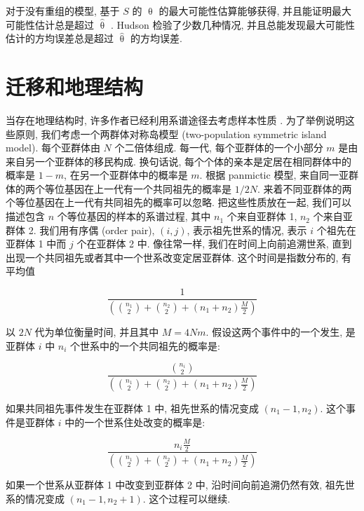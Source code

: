 \documentclass[12pt]{article}
\begin{document}
对于没有重组的模型, 基于 $S$ 的 $\uptheta$ 的最大可能性估算能够获得,
并且能证明最大可能性估计总是超过 $\hat{\uptheta}$ \parencite{tavare1984}.
Hudson 检验了少数几种情况, 并且总能发现最大可能性估计的方均误差总是超过 $\hat{\uptheta}$ 的方均误差.

\section{迁移和地理结构}

当存在地理结构时, 许多作者已经利用系谱途径去考虑样本性质 \parencite{griffiths1981a, tajima1989}.
为了举例说明这些原则, 我们考虑一个两群体对称岛模型 (two-population symmetric island model).
每个亚群体由 $N$ 个二倍体组成. 每一代, 每个亚群体的一个小部分 $m$ 是由来自另一个亚群体的移民构成.
换句话说, 每个个体的亲本是定居在相同群体中的概率是 $1-m$, 在另一个亚群体中的概率是 $m$.
根据 panmictic 模型, 来自同一亚群体的两个等位基因在上一代有一个共同祖先的概率是 $1/2N$.
来着不同亚群体的两个等位基因在上一代有共同祖先的概率可以忽略. 把这些性质放在一起, 我们可以描述包含 $n$
个等位基因的样本的系谱过程, 其中 $n_{1}$ 个来自亚群体 1, $n_{2}$ 个来自亚群体 2. 我们用有序偶 (order pair),
$(i,j)$, 表示祖先世系的情况, 表示 $i$ 个祖先在亚群体 1 中而 $j$ 个在亚群体 2 中.
像往常一样, 我们在时间上向前追溯世系, 直到出现一个共同祖先或者其中一个世系改变定居亚群体.
这个时间是指数分布的, 有平均值

\begin{equation*}
    \frac{1}{(\binom{n_1}{2}+\binom{n_2}{2}+(n_{1}+n_{2})\frac{M}{2})}
\end{equation*}

以 $2N$ 代为单位衡量时间, 并且其中 $M=4Nm$. 假设这两个事件中的一个发生, 是亚群体 $i$ 中 $n_{i}$
个世系中的一个共同祖先的概率是:

\begin{equation*}
    \frac{\binom{n_i}{2}}{(\binom{n_1}{2}+\binom{n_2}{2}+(n_{1}+n_{2})\frac{M}{2})}
\end{equation*}

如果共同祖先事件发生在亚群体 1 中, 祖先世系的情况变成 $(n_{1}-1,n_{2})$. 这个事件是亚群体 $i$
中的一个世系住处改变的概率是:

\begin{equation*}
    \frac{n_{i}\frac{M}{2}}{(\binom{n_1}{2} + \binom{n_2}{2} + (n_{1}+n_{2})\frac{M}{2})}
\end{equation*}

如果一个世系从亚群体 1 中改变到亚群体 2 中, 沿时间向前追溯仍然有效, 祖先世系的情况变成 $(n_{1}-1,n_{2}+1)$.
这个过程可以继续.
\end{document}
